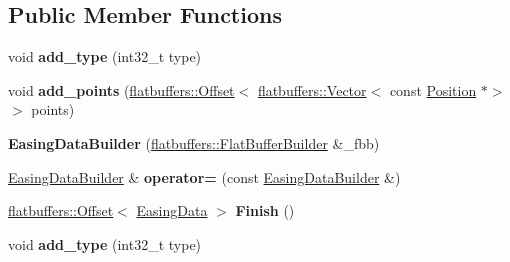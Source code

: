 \subsection*{Public Member Functions}
\begin{DoxyCompactItemize}
\item 
\mbox{\label{structflatbuffers_1_1EasingDataBuilder_a02aa6a3b4caf500be99a813c412d1b8a}} 
void {\bfseries add\+\_\+type} (int32\+\_\+t type)
\item 
\mbox{\label{structflatbuffers_1_1EasingDataBuilder_a6bca2ab977dfe690337dc2a516ca2728}} 
void {\bfseries add\+\_\+points} (\hyperlink{structflatbuffers_1_1Offset}{flatbuffers\+::\+Offset}$<$ \hyperlink{classflatbuffers_1_1Vector}{flatbuffers\+::\+Vector}$<$ const \hyperlink{structPosition}{Position} $\ast$$>$$>$ points)
\item 
\mbox{\label{structflatbuffers_1_1EasingDataBuilder_a1f8180c013c4306ba9a1189f9f34c7f8}} 
{\bfseries Easing\+Data\+Builder} (\hyperlink{classflatbuffers_1_1FlatBufferBuilder}{flatbuffers\+::\+Flat\+Buffer\+Builder} \&\+\_\+fbb)
\item 
\mbox{\label{structflatbuffers_1_1EasingDataBuilder_a4eb83926fd87330e883a13b6b9fca8b2}} 
\hyperlink{structflatbuffers_1_1EasingDataBuilder}{Easing\+Data\+Builder} \& {\bfseries operator=} (const \hyperlink{structflatbuffers_1_1EasingDataBuilder}{Easing\+Data\+Builder} \&)
\item 
\mbox{\label{structflatbuffers_1_1EasingDataBuilder_a9e84d209acb627a9199e3b38e7e037c1}} 
\hyperlink{structflatbuffers_1_1Offset}{flatbuffers\+::\+Offset}$<$ \hyperlink{structflatbuffers_1_1EasingData}{Easing\+Data} $>$ {\bfseries Finish} ()
\item 
\mbox{\label{structflatbuffers_1_1EasingDataBuilder_a02aa6a3b4caf500be99a813c412d1b8a}} 
void {\bfseries add\+\_\+type} (int32\+\_\+t type)
\item 
\mbox{\label{structflatbuffers_1_1EasingDataBuilder_a6bca2ab977dfe690337dc2a516ca2728}} 

\end{DoxyCompactItemize}
